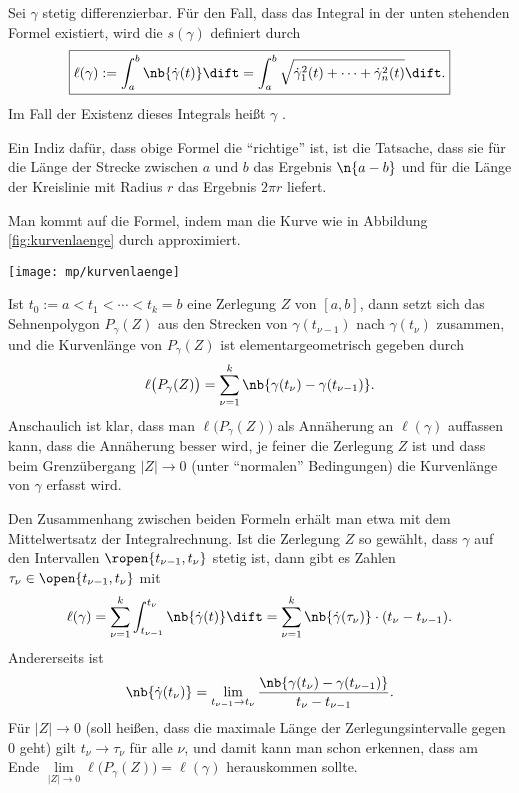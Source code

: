   \begin{antwort}
    Sei $\gamma$ stetig differenzierbar. 
    Für den Fall, dass das Integral in der unten stehenden Formel 
    existiert, wird die  $s(\gamma)$ definiert durch  
    \[
    \boxed{
      \ell(\gamma) := \int_a^b \nb{ \dot{\gamma}(t) } \dift = 
      \int_a^b \sqrt{ \dot{\gamma}_1^2(t) + \cdots + \dot{\gamma}_n^2 (t)} \dift. }
    \]
    Im Fall der Existenz dieses Integrals heißt 
    $\gamma$ .

    Ein Indiz dafür, dass obige Formel die "`richtige"' ist, ist die Tatsache, 
    dass sie für die Länge der Strecke zwischen $a$ und $b$ das Ergebnis $\n{a-b}$ 
    und für die Länge der Kreislinie mit Radius $r$ das Ergebnis $2\pi r$ liefert.  

    Man kommt auf die Formel, indem man die Kurve wie in Abbildung 
    \ref{fig:kurvenlaenge} durch  
    approximiert. 

    \begin{center}
      \texttt{[image: mp/kurvenlaenge]}
      \label{fig:kurvenlaenge}
    \end{center}

    Ist $t_0:=a < t_1 < \cdots < t_k = b$ 
    eine Zerlegung $Z$ von $[a,b]$, dann setzt sich das 
    Sehnenpolygon $P_\gamma(Z)$ aus den Strecken von 
    $\gamma(t_{\nu-1})$ nach $\gamma( t_\nu )$ zusammen, und die 
    Kurvenlänge von $P_\gamma(Z)$ ist elementargeometrisch gegeben durch 
    \[
    \ell\big( P_\gamma(Z) \big) = 
    \sum_{\nu=1}^k \nb{ \gamma( t_{\nu} )- \gamma(t_{\nu-1}) }. 
    \]
    Anschaulich ist klar, dass man $\ell\big( P_\gamma(Z) \big)$ als 
    Annäherung an $\ell(\gamma)$ auffassen kann, dass die Annäherung besser 
    wird, je feiner die Zerlegung $Z$ ist und dass beim Grenzübergang 
    $|Z|\to 0$ (unter "`normalen"' Bedingungen) die Kurvenlänge von 
    $\gamma$ erfasst wird.   

    Den Zusammenhang zwischen beiden Formeln erhält man etwa 
    mit dem Mittelwertsatz der Integralrechnung. 
    Ist die Zerlegung $Z$ so gewählt, dass $\gamma$ auf den 
    Intervallen $\ropen{ t_{\nu-1}, t_\nu }$ stetig ist, dann gibt es 
    Zahlen $\tau_\nu \in \open{ t_{\nu-1}, t_\nu }$ mit 
    \[
    \ell( \gamma ) = \sum_{\nu=1}^k \int_{t_{\nu-1}}^{t_\nu} 
    \nb{ \dot{\gamma}(t) } \dift = 
    \sum_{\nu=1}^k \nb{ \dot{\gamma} (\tau_\nu) } \cdot (t_{\nu}-t_{\nu-1} ).
    \]
    Andererseits ist 
    \[
    \nb{ \dot{\gamma}(t_\nu) } = 
    \lim_{t_{\nu-1}\to t_{\nu}}  
    \frac{\nb{ \gamma(t_\nu)-\gamma(t_{\nu-1})}}{t_\nu-t_{\nu-1}}.
    \]
    Für $|Z|\to 0$ (soll heißen, dass die maximale Länge der Zerlegungsintervalle 
    gegen $0$ geht) gilt $t_{\nu}\to \tau_\nu$ für alle 
    $\nu$, und damit kann man schon erkennen, dass am Ende  
    $\lim\limits_{|Z|\to 0} \ell\big( P_\gamma (Z) \big)=\ell(\gamma)$ 
    herauskommen sollte. 


\end{antwort}
